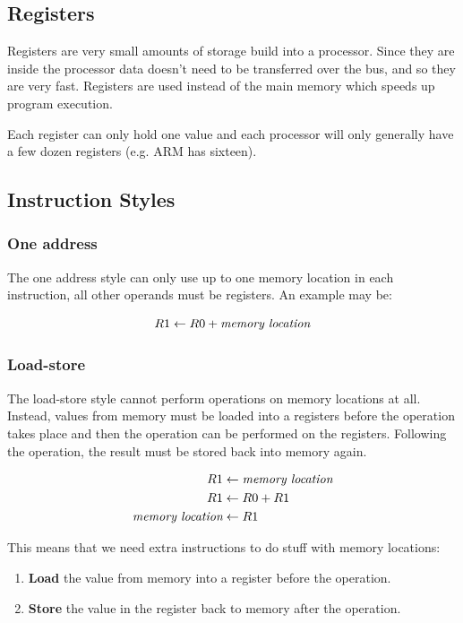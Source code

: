 \subsection{Registers}
Registers are very small amounts of storage build into a processor. Since they are inside the processor data doesn't need to be transferred over the bus, and so they are very fast. Registers are used instead of the main memory which speeds up program execution.

Each register can only hold one value and each processor will only generally have a few dozen registers (e.g. ARM has sixteen).

\subsection{Instruction Styles}

\subsubsection{One address}
The one address style can only use up to one memory location in each instruction, all other operands must be registers. An example may be:

\[
    R1 \leftarrow R0 + \textrm{\it memory location}
\]

\subsubsection{Load-store}
The load-store style cannot perform operations on memory locations at all. Instead, values from memory must be loaded into a registers before the operation takes place and then the operation can be performed on the registers. Following the operation, the result must be stored back into memory again.

\[
	\begin{split}
	    R1 &\leftarrow \textrm{\it memory location}\\
		R1 &\leftarrow R0 + R1\\
	    \textrm{\it memory location} &\leftarrow R1
    \end{split}
\]

This means that we need extra instructions to do stuff with memory locations:
\begin{enumerate}
	\item \textbf{Load} the value from memory into a register before the operation.
	\item \textbf{Store} the value in the register back to memory after the operation.
\end{enumerate}

